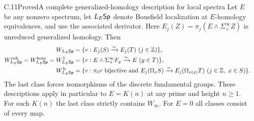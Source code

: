 \begin{claim}{C.11}{Proved}{A complete generalized-homology description for local spectra}
Let $E$ be any nonzero spectrum, let $L_E\mathsf{Sp}$ denote Bousfield localization at $E$-homology equivalences, and use the associated derivator.  Here $E_j(Z)=\pi_j(E\wedge\Sigma^\infty_+Z)$ is unreduced generalized homology.  Then
\begin{align*}
 W_{L_E\mathsf{Sp}}&=\{v:E_j(S)\xrightarrow{\sim}E_j(T)\ (j\in\mathbb Z)\},\\
 W_{L_E\mathsf{Sp}}^{\mathrm{coh}}=W_{L_E\mathsf{Sp}}^{\mathrm{hom}}=W_{L_E\mathsf{Sp}}^{1}
 &=\{v:E\wedge\Sigma^\infty_+F_y\xrightarrow{\sim}E\ (y\in T)\},\\
 W_{L_E\mathsf{Sp}}^{\mathrm{lc}}
 &=\{v:\pi_0v\text{ bijective and }E_j(\Omega_xS)\xrightarrow{\sim}E_j(\Omega_{v(x)}T)
 \ (j\in\mathbb Z,\ x\in S)\}.
\end{align*}
The last class forces isomorphisms of the discrete fundamental groups.  These descriptions apply in particular to $E=K(n)$ at any prime and height $n\geq1$.  For such $K(n)$ the last class strictly contains $W_\infty$.  For $E=0$ all classes consist of every map.
\end{claim}
